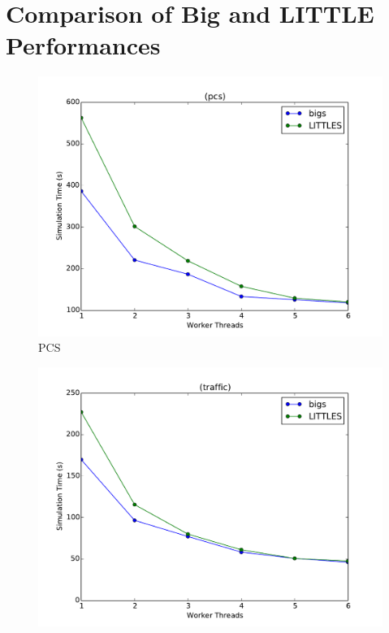 \documentclass[11pt]{book}
\begin{document}
\section{Comparison of Big and LITTLE Performances}

\begin{figure}
  \begin{minipage}{.5\textwidth}
    \begin{center}
      \includegraphics[width=\textwidth,keepaspectratio,quiet]{figs/big_little/pcs_rr.pdf} \\
      PCS \\
    \end{center}
  \end{minipage}%
  \hfill
  \begin{minipage}{.5\textwidth}
    \begin{center}
      \includegraphics[width=\textwidth,keepaspectratio,quiet]{figs/big_little/traffic_rr.pdf} \\

\end{center}
\end{minipage}
\end{figure}
\end{document}
